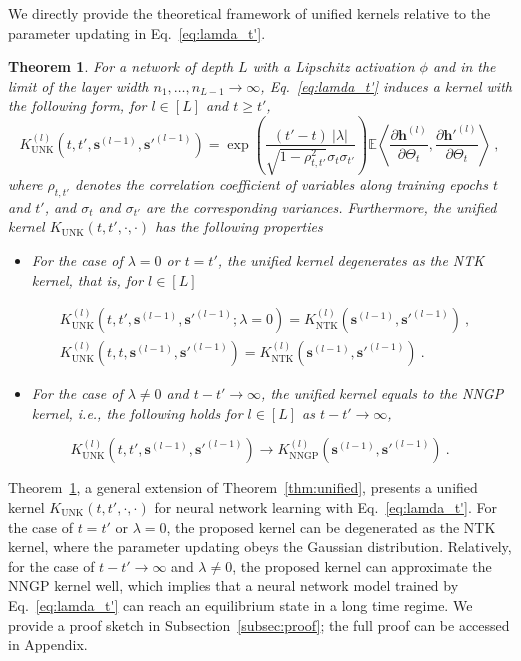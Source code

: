 \documentclass[review,10pt]{JMtemplate}
\newtheorem{theorem}{Theorem}
\begin{document}
We directly provide the theoretical framework of unified kernels relative to the parameter updating in Eq.~\eqref{eq:lamda_t'}.
\begin{theorem}  \label{thm:unified_2}
For a network of depth $L$ with a Lipschitz activation $\phi$ and in the limit of the layer width $n_1, \dots, n_{L-1} \to \infty$, Eq.~\eqref{eq:lamda_t'} induces a kernel with the following form, for $l\in[L]$ and $t\geq t'$,
\begin{equation}  \label{eq:our_kernel_2}
K_{\textrm{UNK}}^{(l)} \left( t, t', \boldsymbol{s}^{(l-1)}, \boldsymbol{s}'^{(l-1)} \right) = \exp\left( \frac{ (t'-t) ~|\lambda|}{\sqrt{1-\rho_{t,t'}^2}\sigma_{t}\sigma_{t'} } \right) \mathbb{E} \left\langle \frac{\partial \boldsymbol{h}^{(l)}}{\partial \Theta_t} , \frac{\partial \boldsymbol{h}'^{(l)}}{\partial \Theta_t}  \right\rangle \ , 
\end{equation}
where $\rho_{t, t'}$ denotes the correlation coefficient of variables along training epochs $t$ and $t'$, and $\sigma_t$ and $\sigma_{t'}$ are the corresponding variances. Furthermore, the unified kernel $K_{\textrm{UNK}}(t,t',\cdot,\cdot)$ has the following properties
\begin{itemize}
    \item[(i)] For the case of $\lambda=0$ or $t=t'$, the unified kernel degenerates as the NTK kernel, that is, for $l\in[L]$
\end{itemize}
\[
\begin{aligned}
& K_{\textrm{UNK}}^{(l)} \left( t, t', \boldsymbol{s}^{(l-1)}, \boldsymbol{s}'^{(l-1)}; \lambda=0 \right) = K_{\textrm{NTK}}^{(l)} \left(  \boldsymbol{s}^{(l-1)}, \boldsymbol{s}'^{(l-1)} \right) \ , \\
& K_{\textrm{UNK}}^{(l)} \left( t, t, \boldsymbol{s}^{(l-1)}, \boldsymbol{s}'^{(l-1)} \right) = K_{\textrm{NTK}}^{(l)} \left(  \boldsymbol{s}^{(l-1)}, \boldsymbol{s}'^{(l-1)} \right) \ .
\end{aligned}
\]
\begin{itemize}
    \item[(ii)] For the case of $\lambda \neq 0$ and $t-t' \to \infty$, the unified kernel equals to the NNGP kernel, i.e., the following holds for $l\in[L]$ as $t-t' \to \infty$,
\end{itemize}
\[
K_{\textrm{UNK}}^{(l)} \left( t, t', \boldsymbol{s}^{(l-1)}, \boldsymbol{s}'^{(l-1)} \right) \to K_{\textrm{NNGP}}^{(l)} \left(  \boldsymbol{s}^{(l-1)}, \boldsymbol{s}'^{(l-1)} \right) \ .
\]
\end{theorem}
Theorem~\ref{thm:unified_2}, a general extension of Theorem~\ref{thm:unified}, presents a unified kernel $K_{\textrm{UNK}}(t,t',\cdot,\cdot)$ for neural network learning with Eq.~\eqref{eq:lamda_t'}. For the case of $t=t'$ or $\lambda =0$, the proposed kernel can be degenerated as the NTK kernel, where the parameter updating obeys the Gaussian distribution. Relatively, for the case of $t-t' \to \infty$ and $\lambda \neq 0$, the proposed kernel can approximate the NNGP kernel well, which implies that a neural network model trained by Eq.~\eqref{eq:lamda_t'} can reach an equilibrium state in a long time regime. We provide a proof sketch in Subsection~\ref{subsec:proof}; the full proof can be accessed in Appendix.
\end{document}
